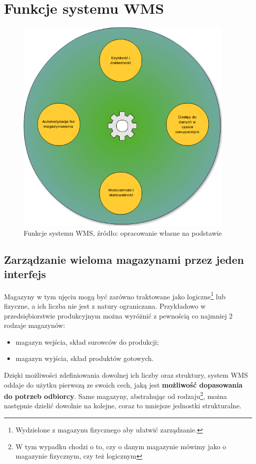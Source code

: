 \section{Funkcje systemu WMS}
	\begin{figure}[H]
		\begin{center}
			\includegraphics[width=0.95\textwidth]{images/wms_functionality}
		\end{center}
		\caption[Funkcjonalność systemu WMS]{
			Funkcje systemu WMS, źródło: opracowanie własne na podstawie \cite{logistyka_w_przedsiebiorstwie}
		}
		\label{fig:c5:wms_basic_functionality}
	\end{figure}
	\subsection{Zarządzanie wieloma magazynami przez jeden interfejs}
		Magazyny w tym ujęciu mogą być zarówno traktowane jako logiczne\footnote{Wydzielone z magazynu fizycznego
		aby ułatwić zarządzanie.} lub fizyczne, a ich liczba nie jest z natury ograniczana. Przykładowo w przedsiębiorstwie
		produkcyjnym można wyróżnić z pewnością co najmniej 2 rodzaje magazynów:
		\begin{itemize}
			\item magazyn wejścia, skład surowców do produkcji;
			\item magazyn wyjścia, skład produktów gotowych.
		\end{itemize}			
		Dzięki możliwości zdefiniowania dowolnej ich liczby oraz struktury, system WMS oddaje do użytku
		pierwszą ze swoich cech, jaką jest \textbf{możliwość dopasowania do potrzeb odbiorcy}.
		Same magazyny, abstrahując od rodzaju\footnote{W tym wypadku chodzi o to, czy o danym magazynie mówimy jako
		o magazynie fizycznym, czy też logicznym}, można następnie dzielić dowolnie na kolejne, coraz to mniejsze 
		jednostki strukturalne.
